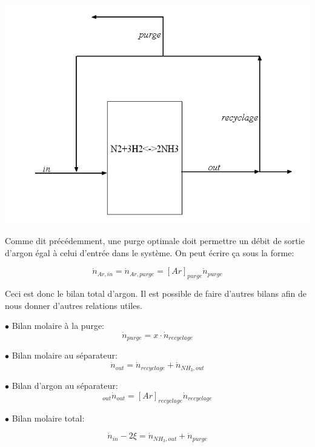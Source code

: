 \documentclass[a4paper, oneside, 12pt]{article}
\begin{document}
\includegraphics[scale=0.5]{etape_finale_simpl.jpg} 

Comme dit précédemment, une purge optimale doit permettre un débit 
de sortie d'argon égal à celui d'entrée dans le système. 
On peut écrire ça sous la forme:

\begin{equation}
\dot{n}_{Ar,in}=\dot{n}_{Ar,purge}=[Ar]_{purge} \dot{n}_{purge}
\end{equation}

Ceci est donc le bilan total d'argon. 
Il est possible de faire d'autres bilans afin de nous donner d'autres relations utiles.

$\bullet$ Bilan molaire à la purge:
\begin{equation}
\dot{n}_{purge} = x \cdot \dot{n}_{recyclage}
\label{eq:bilan_mol_purge}
\end{equation}

$\bullet$ Bilan molaire au séparateur:
\begin{equation}
\dot{n}_{out}=\dot{n}_{recyclage}+\dot{n}_{NH_3,out}
\end{equation}

$\bullet$ Bilan d'argon au séparateur:
\begin{equation}
[Ar]_{out} \dot{n}_{out}=[Ar]_{recyclage} \dot{n}_{recyclage}
\end{equation}

$\bullet$ Bilan molaire total:

\begin{equation}
	\dot{n}_{in} - 2\xi=\dot{n}_{NH_3,out} + \dot{n}_{purge}
\end{equation}
\end{document}
